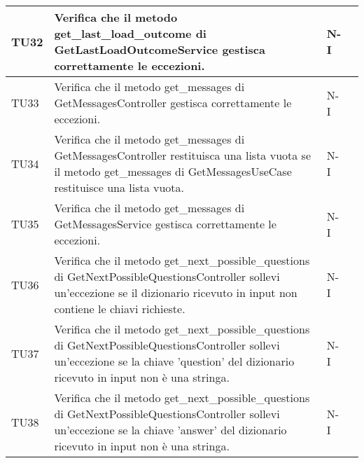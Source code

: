 \begin{table}[h!]
\begin{tabularx}{\textwidth}{|p{}|X|p{}|p{}|}
    TU32 & Verifica che il metodo get\_last\_load\_outcome di GetLastLoadOutcomeService gestisca correttamente le eccezioni. &  N-I \\ \hline
    TU33 & Verifica che il metodo get\_messages di GetMessagesController gestisca correttamente le eccezioni. &  N-I \\ \hline
    TU34 & Verifica che il metodo get\_messages di GetMessagesController restituisca una lista vuota se il metodo get\_messages di GetMessagesUseCase restituisce una lista vuota. &  N-I \\ \hline
    TU35 & Verifica che il metodo get\_messages di GetMessagesService gestisca correttamente le eccezioni. &  N-I \\ \hline
    TU36 & Verifica che il metodo get\_next\_possible\_questions di GetNextPossibleQuestionsController sollevi un'eccezione se il dizionario ricevuto in input non contiene le chiavi richieste. &  N-I \\ \hline
    TU37 & Verifica che il metodo get\_next\_possible\_questions di GetNextPossibleQuestionsController sollevi un'eccezione se la chiave 'question' del dizionario ricevuto in input non è una stringa. &  N-I \\ \hline
    TU38 & Verifica che il metodo get\_next\_possible\_questions di GetNextPossibleQuestionsController sollevi un'eccezione se la chiave 'answer' del dizionario ricevuto in input non è una stringa. &  N-I \\ \hline
    \end{tabularx}
\end{table}

\newpage

